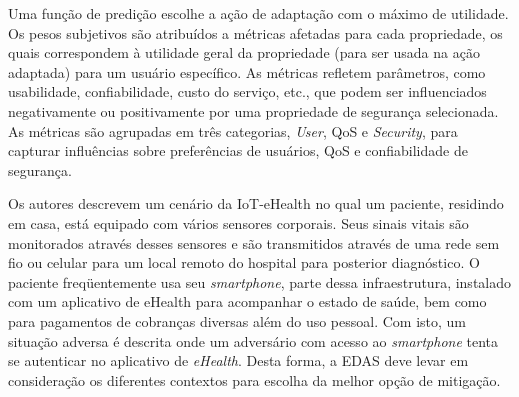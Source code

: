 \documentclass[tid,table]{texufpel} %
\begin{document}
Uma função de predição escolhe a ação de adaptação com o máximo de utilidade. Os pesos subjetivos são atribuídos a métricas afetadas para cada propriedade, os quais correspondem à utilidade geral da propriedade (para ser usada na ação adaptada) para um usuário específico. As métricas refletem parâmetros, como usabilidade, confiabilidade, custo do serviço, etc., que podem ser influenciados negativamente ou positivamente por uma propriedade de segurança selecionada. As métricas são agrupadas em três categorias, \textit{User}, QoS e \textit{Security}, para capturar influências sobre preferências de usuários, QoS e confiabilidade de segurança.

Os autores descrevem um cenário da IoT-eHealth no qual um paciente, residindo em casa, está equipado com vários sensores corporais. Seus sinais vitais são monitorados através desses sensores e são transmitidos através de uma rede sem fio ou celular para um local remoto do hospital para posterior diagnóstico. O paciente freqüentemente usa seu \textit{smartphone}, parte dessa infraestrutura, instalado com um aplicativo de eHealth para acompanhar o estado de saúde, bem como para pagamentos de cobranças diversas além do uso pessoal. Com isto, um situação adversa é descrita onde um adversário com acesso ao  \textit{smartphone} tenta se autenticar no aplicativo de \textit{eHealth}. Desta forma, a EDAS deve levar em consideração os diferentes contextos para escolha da melhor opção de mitigação.

\end{document}
